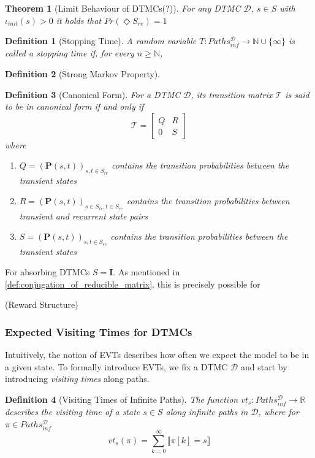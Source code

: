 \documentclass[journal,compsoc,10pt]{IEEEtran}
\newcommand{\RR}{\mathbb{R}}
\newcommand{\NN}{\mathbb{N}}
\newcommand{\MC}{\mathcal{D}} %
\newcommand{\tT}{\mathcal{T}} %
\newcommand{\PF}{\mathbf{P}} %
\newcommand{\Path}{Paths^{\MC}_{inf}} %
\newcommand{\eye}{\bm{I}}              %
\newtheorem{theorem}{Theorem}[section]
\newtheorem{definition}{Definition}[section]
\begin{document}
\begin{theorem}[Limit Behaviour of DTMCs(?)]
    For any DTMC $\MC$, $s\in S$ with $\iota_{init}(s) > 0$ it holds that $Pr(\Diamond S_{re})=1$
\end{theorem}

\begin{definition}[Stopping Time]
    A random variable $T:\Path\rightarrow \NN\cup\{\infty\}$ is called a \textit{stopping time} if, for every $n\geq \NN$, 
\end{definition}

\begin{definition}[Strong Markov Property]

\end{definition}

\begin{definition}[Canonical Form]\label{def:canonical_form}
    For a DTMC $\MC$, its transition matrix $\tT$ is said to be in canonical form if and only if
    \[\tT = \begin{bmatrix}
        Q & R\\
        0 & S
    \end{bmatrix}\]
    where 
    \begin{enumerate}[label=(\roman*)]
        \item $Q = (\PF(s,t))_{s,t\in S_{tr}}$ contains the transition probabilities between the transient states
        \item $R = (\PF(s,t))_{s\in S_{tr},t\in S_{re}}$ contains the transition probabilities between transient and recurrent state pairs
        \item $S = (\PF(s,t))_{s,t\in S_{re}}$ contains the transition probabilities between the transient states
    \end{enumerate}
\end{definition}
For absorbing DTMCs $S = \eye$.
As mentioned in \cref{def:conjugation_of_reducible_matrix}, this is precisely possible for 

(Reward Structure)  

\subsubsection{Expected Visiting Times for DTMCs}\label{sec:EVTs_for_DTMCs}
Intuitively, the notion of EVTs describes how often we expect the model to be in a given state. To formally introduce EVTs, we fix a DTMC $\MC$ and start by introducing \textit{visiting times} along paths.
\begin{definition}[Visiting Times of Infinite Paths]\label{def:visiting_times_of_infinite_paths}
    The function $vt_s:\Path \rightarrow \RR$ describes the \textit{visiting time} of a state $s\in S$ along infinite paths in $\MC$, where for $\pi\in \Path$
    \[vt_s(\pi)=\sum_{k=0}^{\infty}\llbracket \pi[k]=s \rrbracket\]
\end{definition}
\end{document}
